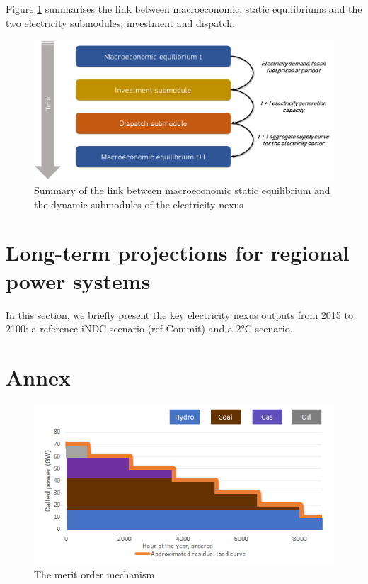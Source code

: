 Figure \ref{fig:sumacro} summarises the link between macroeconomic, static equilibriums and the two electricity submodules, investment and dispatch.

\begin{figure}[H]
    \centerline{\includegraphics[scale=0.5]{figures&tables/summacro.png}}
    \caption{Summary of the link between macroeconomic static equilibrium and the dynamic submodules of the electricity nexus}
    \label{fig:sumacro}
\end{figure}


\section{Long-term projections for regional power systems}
In this section, we briefly present the key electricity nexus outputs from 2015 to 2100: a reference iNDC scenario (ref Commit) and a 2°C scenario. 

\newpage
\section{Annex}

\begin{figure}[H]
    \centering
    \includegraphics{figures&tables/dispatch.png}
    \caption{The merit order mechanism}
    \label{fig:dispatch}
\end{figure}

